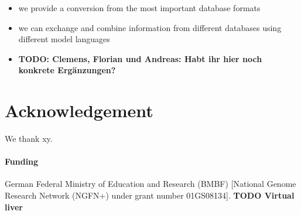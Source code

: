 \documentclass{bioinfo}
\begin{document}
\begin{itemize}
\item we provide a conversion from the most important database formats
\item we can exchange and combine information from different databases using different model languages
\item \textbf{TODO: Clemens, Florian und Andreas: Habt ihr hier noch konkrete Erg\"anzungen?}
\end{itemize}


\section*{Acknowledgement}
We thank xy.

\paragraph{Funding\textcolon} German Federal Ministry of Education and Research (BMBF) [National Genome Research Network (NGFN+) under grant number 01GS08134]. \textbf{TODO Virtual liver}


%
%
%
%
%
%

\end{document}
